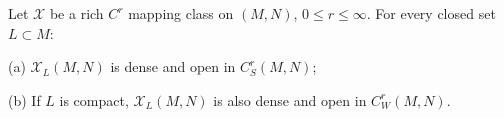 Let $\mathcal{X}$ be a rich $C^r$ mapping class on $(M,N)$, $0 \leqslant r \leqslant \infty$. For every closed set $L \subset M$:

(a) $\mathcal{X}_L(M,N)$ is dense and open in $C^r_S(M,N)$;

(b) If $L$ is compact, $\mathcal{X}_L(M,N)$ is also dense and open in $C^r_W(M,N)$.
